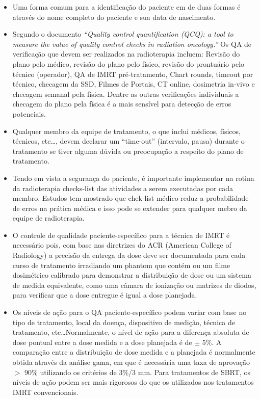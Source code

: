 \documentclass[11pt,a4paper]{article}
\newcounter{exemplo}
\begin{document}
\begin{exemplo}[Qualidade]
\begin{itemize}
        \item Uma forma comum para a identificação do paciente em de duas formas é através do nome completo do paciente e sua data de nascimento.

        \item Segundo o documento \textit{``Quality control quantification (QCQ): a tool to measure the value of quality control checks in radiation oncology.''} Os QA de verificação que devem ser realizados na radioterapia incluem: Revisão do plano pelo médico, revisão do plano pelo físico, revisão do prontuário pelo técnico (operador), QA de IMRT pré-tratamento, Chart rounds, timeout por técnico, checagem da SSD, Filmes de Portais, CT online, dosimetria in-vivo e checagem semanal pela física. Dentre as outras verificações individuais a checagem do plano pela física é a mais sensível para detecção de erros potenciais.
        
        \item Qualquer membro da equipe de tratamento, o que inclui médicos, físicos, técnicos, etc\dots, devem declarar um ``time-out'' (intervalo, pausa) durante o tratamento  se tiver alguma dúvida ou preocupação a respeito do plano de tratamento.
        
        \item Tendo em vista a segurança do paciente, é importante implementar na rotina da radioterapia checks-list das atividades a serem executadas por cada membro. Estudos tem mostrado que chek-list médico reduz a probabilidade de erros na prática médica e isso pode se extender para qualquer mebro da equipe de radioterapia.
        
        \item O controle de qualidade paciente-específico para a técnica de IMRT é necessário pois, com base nas diretrizes do ACR (American College of Radiology) a precisão da entrega da dose deve ser documentada para cada curso de tratamento irradiando um phantom que contém ou um filme dosimétrico calibrado para demonstrar a distribuição de dose ou um sistema de medida equivalente, como uma câmara de ionização ou matrizes de diodos, para verificar que a dose entregue é igual a dose planejada.
        
        \item Os níveis de ação para o QA paciente-específico podem variar com base no tipo de tratamento, local da doença, dispositivo de medição, técnica de tratamento, etc\dots Normalmente, o nível de ação para a diferença absoluta de dose pontual entre a dose medida e a dose planejada é de $\pm$ 5\%. A comparação entre a distribuição de dose medida e a planejada é normalmente obtida através da análise gama, em que é necessária uma taxa de aprovação $>$ 90\% utilizando os critérios de 3\%/3 mm. Para tratamentos de SBRT, os níveis de ação podem ser mais rigorosos do que os utilizados nos tratamentos IMRT convencionais.
        

\end{itemize}
\end{exemplo}
\end{document}
